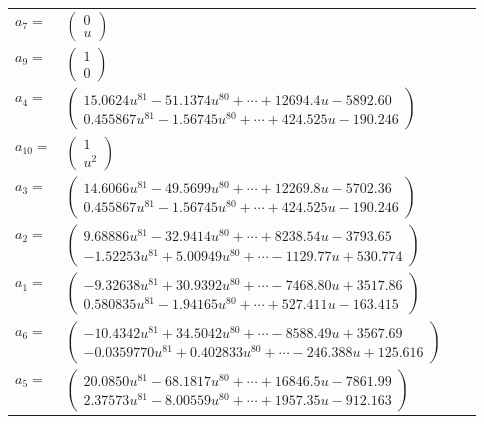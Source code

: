 \documentclass[1p]{elsarticle_modified}
\theoremstyle{definition}
\begin{document}
\begin{tabular}{m{7pt} m{180pt} m{7pt} m{180pt} }
\flushright $a_{7}=$&$\begin{pmatrix}0\\u\end{pmatrix}$ \\
\flushright $a_{9}=$&$\begin{pmatrix}1\\0\end{pmatrix}$ \\
\flushright $a_{4}=$&$\begin{pmatrix}15.0624 u^{81}-51.1374 u^{80}+\cdots+12694.4 u-5892.60\\0.455867 u^{81}-1.56745 u^{80}+\cdots+424.525 u-190.246\end{pmatrix}$ \\
\flushright $a_{10}=$&$\begin{pmatrix}1\\u^2\end{pmatrix}$ \\
\flushright $a_{3}=$&$\begin{pmatrix}14.6066 u^{81}-49.5699 u^{80}+\cdots+12269.8 u-5702.36\\0.455867 u^{81}-1.56745 u^{80}+\cdots+424.525 u-190.246\end{pmatrix}$ \\
\flushright $a_{2}=$&$\begin{pmatrix}9.68886 u^{81}-32.9414 u^{80}+\cdots+8238.54 u-3793.65\\-1.52253 u^{81}+5.00949 u^{80}+\cdots-1129.77 u+530.774\end{pmatrix}$ \\
\flushright $a_{1}=$&$\begin{pmatrix}-9.32638 u^{81}+30.9392 u^{80}+\cdots-7468.80 u+3517.86\\0.580835 u^{81}-1.94165 u^{80}+\cdots+527.411 u-163.415\end{pmatrix}$ \\
\flushright $a_{6}=$&$\begin{pmatrix}-10.4342 u^{81}+34.5042 u^{80}+\cdots-8588.49 u+3567.69\\-0.0359770 u^{81}+0.402833 u^{80}+\cdots-246.388 u+125.616\end{pmatrix}$ \\
\flushright $a_{5}=$&$\begin{pmatrix}20.0850 u^{81}-68.1817 u^{80}+\cdots+16846.5 u-7861.99\\2.37573 u^{81}-8.00559 u^{80}+\cdots+1957.35 u-912.163\end{pmatrix}$ \\

\end{tabular}
\end{document}
